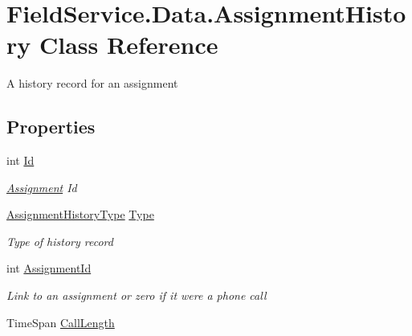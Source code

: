 \hypertarget{class_field_service_1_1_data_1_1_assignment_history}{\section{Field\+Service.\+Data.\+Assignment\+History Class Reference}
\label{class_field_service_1_1_data_1_1_assignment_history}
}


A history record for an assignment  


\subsection*{Properties}
\begin{DoxyCompactItemize}
\item 
int \hyperlink{class_field_service_1_1_data_1_1_assignment_history_af535237bdf038d26650fe0ccf7bb5259}{Id}
\begin{DoxyCompactList}\small\item\em \hyperlink{class_field_service_1_1_data_1_1_assignment}{Assignment} Id \end{DoxyCompactList}\item 
\hyperlink{namespace_field_service_1_1_data_adab81adc38635c82c27eb6518365aa95}{Assignment\+History\+Type} \hyperlink{class_field_service_1_1_data_1_1_assignment_history_a4fc66110defa0c09b59329131891e9d3}{Type}
\begin{DoxyCompactList}\small\item\em Type of history record \end{DoxyCompactList}\item 
int \hyperlink{class_field_service_1_1_data_1_1_assignment_history_a12ccf3b4e75cfaf489f74366bacd081b}{Assignment\+Id}
\begin{DoxyCompactList}\small\item\em Link to an assignment or zero if it were a phone call \end{DoxyCompactList}\item 
Time\+Span \hyperlink{class_field_service_1_1_data_1_1_assignment_history_a6219469fd9d6a9de6db09e6119dcf084}{Call\+Length}

\end{DoxyCompactItemize}
